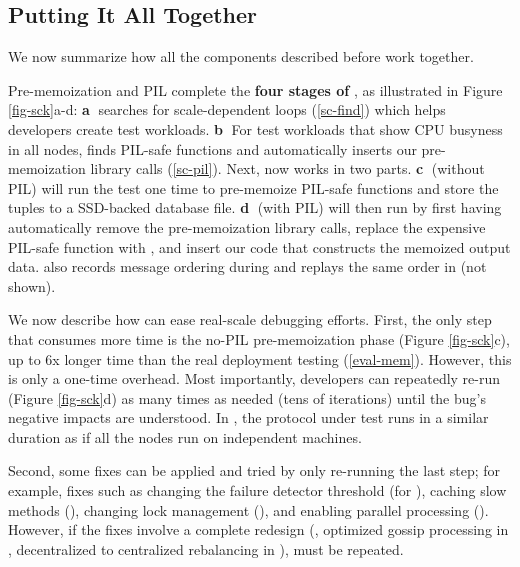 




\subsection{Putting It All Together}
\label{sc-summ}

We now summarize how all the \sck components described before
work together.


Pre-memoization and PIL complete the {\bf four
stages of \sck}, as illustrated in Figure \ref{fig-sck}a-d:
%
\textbf{\textcircled{a}} \sfind searches for scale-dependent loops
(\sec\ref{sc-find}) which helps developers create test workloads.
%
\textbf{\textcircled{b}}
%
For test workloads that show CPU busyness in all nodes, \sfindp finds
PIL-safe functions and automatically inserts our pre-memoization library
calls (\sec\ref{sc-pil}).
%
Next, \stest now works in two parts.
%
\textbf{\textcircled{c}} \stestm (without PIL) will run the test one time
to pre-memoize PIL-safe functions and store the tuples to a 
SSD-backed database file.
%
\textbf{\textcircled{d}} \stestp (with PIL) will then run by first having
\sfindp automatically remove the pre-memoization library calls, replace
the expensive PIL-safe function with , and insert our code
that constructs the memoized output data.
%
\sck also records message ordering during \stestm and replays the same
order in \stestp (not shown).


 We now describe how \sck can ease real-scale
debugging efforts.
%
First, the only step that consumes  more time is the no-PIL
pre-memoization phase (Figure \ref{fig-sck}c), up to 6x longer time
than the real deployment testing (\sec\ref{eval-mem}).  
However, this is only a one-time overhead.
%
Most importantly, developers can repeatedly re-run \stestp (Figure
\ref{fig-sck}d) as many times as needed (tens of iterations) until the
bug's negative impacts are understood.  In \stestp, the protocol under
test runs in a similar duration as if all the nodes run on independent
machines.


Second, some fixes can be applied and tried by only re-running the last
step; for example, fixes such as
%
changing the failure detector \phi threshold (for \caone),
%
caching slow methods (\catwo),
%
changing lock management (\cafour), and
%
enabling parallel processing (\voldone).
%
However, if the fixes involve a complete redesign (\eg, optimized gossip
processing in \catri, decentralized to centralized rebalancing in
\riakone), \stestm must be repeated.
